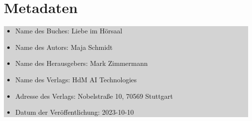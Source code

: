 \documentclass[12pt]{article}
\begin{document}
\section*{Metadaten}
\colorbox{lightgray}{
    \begin{minipage}{\dimexpr\textwidth-2\fboxsep}
        \vspace{1cm}
        \begin{itemize}
            \item Name des Buches: Liebe im Hörsaal
            \item Name des Autors: Maja Schmidt
            \item Name des Herausgebers: Mark Zimmermann
            \item Name des Verlags: HdM AI Technologies
            \item Adresse des Verlags: Nobelstraße 10, 70569 Stuttgart
            \item Datum der Veröffentlichung: 2023-10-10
        \end{itemize}
        \vspace{1cm}
    \end{minipage}
}
\end{document}

